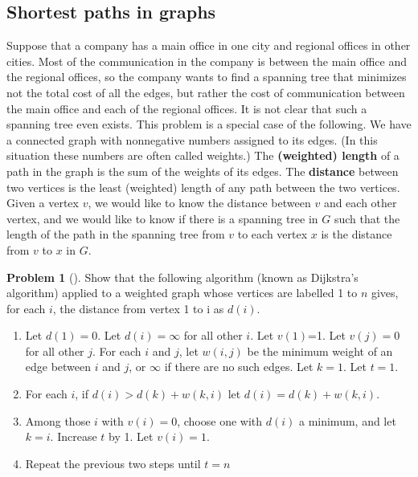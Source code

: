 \documentclass[10pt,]{book}
\newcommand{\terminology}[1]{\textbf{#1}}
\theoremstyle{plain}
\theoremstyle{definition}
\newtheorem{activity}[project]{Problem}
\theoremstyle{definition}
\numberwithin{equation}{chapter}
\begin{document}
\subsection[{Shortest paths in graphs}]{Shortest paths in graphs}\label{subsection-27}
\hypertarget{p-681}{}%
Suppose that a company has a main office in one city and regional offices in other cities. Most of the communication in the company is between the main office and the regional offices, so the company wants to find a spanning tree that minimizes not the total cost of all the edges, but rather the cost of communication between the main office and each of the regional offices. It is not clear that such a spanning tree even exists. This problem is a special case of the following. We have a connected graph with nonnegative numbers assigned to its edges. (In this situation these numbers are often called weights.) The \terminology{(weighted) length} of a path in the graph is the sum of the weights of its edges. The \terminology{distance} between two vertices is the least (weighted) length of any path between the two vertices. Given a vertex \(v\), we would like to know the distance between \(v\) and each other vertex, and we would like to know if there is a spanning tree in \(G\) such that the length of the path in the spanning tree from \(v\) to each vertex \(x\) is the distance from \(v\) to \(x\) in \(G\).%
\begin{activity}[]\marginsymbol[-1em]{} \label{Dijkstra}
\hypertarget{p-682}{}%
Show that the following algorithm (known as Dijkstra's algorithm) applied to a weighted graph whose vertices are labelled 1 to \(n\) gives, for each \(i\), the distance from vertex 1 to i as \(d(i)\). \leavevmode%
\begin{enumerate}
\item\hypertarget{li-27}{}\hypertarget{p-683}{}%
Let \(d(1) = 0\). Let \(d(i) = \infty\) for all other \(i\).  Let \(v(1)\)=1. Let \(v(j) = 0\) for all other \(j\).  For each \(i\) and \(j\), let \(w(i,j)\) be the minimum weight of an edge between \(i\) and \(j\), or \(\infty\) if there are no such edges.  Let \(k=1\).  Let \(t=1\).%
\item\hypertarget{li-28}{}\hypertarget{p-684}{}%
For each \(i\), if \(d(i)>d(k) + w(k,i)\) let \(d(i)= d(k) +w(k,i)\).%
\item\hypertarget{li-29}{}\hypertarget{p-685}{}%
Among those \(i\) with \(v(i)=0\), choose one with \(d(i)\) a minimum, and let \(k=i\).  Increase \(t\) by 1. Let \(v(i) =1.\)%
\item\hypertarget{li-30}{}\hypertarget{p-686}{}%
Repeat the previous two steps until \(t=n\)%
\end{enumerate}
%
\end{activity}
\end{document}
